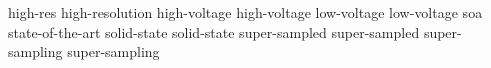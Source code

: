 \newglsXbasic%
{high-res}%
{high{\--}resolution}%
\newglsXbasic%
{high-voltage}%
{high{\--}voltage}%
\newglsXbasic%
{low-voltage}%
{low{\--}voltage}%
\newglsXbasic%
{soa}%
{state{\--}of{\--}the{\--}art}%
\newglsXbasic%
{solid-state}%
{solid{\--}state}%
\newglsXbasic%
{super-sampled}%
{super{\--}sampled}%
\newglsXbasic%
{super-sampling}%
{super{\--}sampling}%